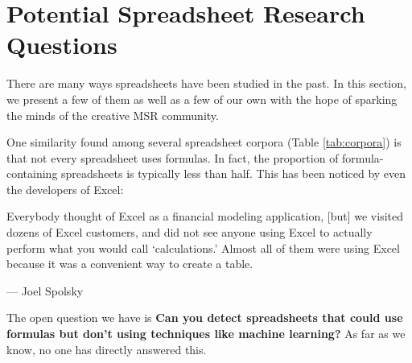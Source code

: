 \documentclass[conference]{IEEEtran}
\newcommand{\xlscount}{249,376}
\begin{document}
% 
% 


\section{Potential Spreadsheet Research Questions}
\label{how_to_use_fuse}
There are many ways spreadsheets have been studied in the past.  
In this section, we present a few of them as well as a few of our own with the hope of sparking the minds of the creative MSR community.

One similarity found among several spreadsheet corpora (Table \ref{tab:corpora}) is that not every spreadsheet uses formulas.  
In fact, the proportion of formula-containing spreadsheets is typically less than half.
This has been noticed by even the developers of Excel:
\begin{displayquote}
Everybody thought of Excel as a financial modeling application, [but] we visited dozens of Excel customers, and did not see anyone using Excel to actually perform what you would call `calculations.' Almost all of them were using Excel because it was a convenient way to create a table.

 --- Joel Spolsky~\cite{JoelOnSoftware}
\end{displayquote}
The open question we have is \textbf{Can you detect spreadsheets that could use formulas but don't using techniques like machine learning?}
As far as we know, no one has directly answered this.
\end{document}
